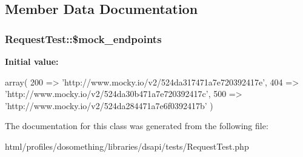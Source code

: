 \subsection{Member Data Documentation}
\hypertarget{classRequestTest_a7409e20affc7eb31b91507c3b63973d4}{
\subsubsection[{\$mock\_\-endpoints}]{\setlength{\rightskip}{0pt plus 5cm}RequestTest::\$mock\_\-endpoints}}
\label{classRequestTest_a7409e20affc7eb31b91507c3b63973d4}
{\bfseries Initial value:}
\begin{DoxyCode}
 array(
        200 => 'http://www.mocky.io/v2/524da317471a7e720392417e',
        404 => 'http://www.mocky.io/v2/524da30b471a7e720392417c',
        500 => 'http://www.mocky.io/v2/524da284471a7e6f0392417b'
    )
\end{DoxyCode}


The documentation for this class was generated from the following file:\begin{DoxyCompactItemize}
\item 
html/profiles/dosomething/libraries/dsapi/tests/RequestTest.php\end{DoxyCompactItemize}
